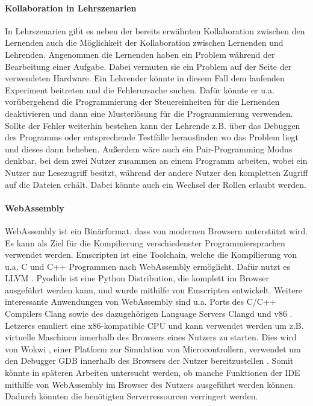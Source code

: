\paragraph{Kollaboration in Lehrszenarien}
In Lehrszenarien gibt es neben der bereits erwähnten Kollaboration zwischen den Lernenden auch die Möglichkeit der Kollaboration zwischen Lernenden und Lehrenden. Angenommen die Lernenden haben ein Problem während der Bearbeitung einer Aufgabe. Dabei vermuten sie ein Problem auf der Seite der verwendeten Hardware. Ein Lehrender könnte in diesem Fall dem laufenden Experiment beitreten und die Fehlerursache suchen. Dafür könnte er u.a. vorübergehend die Programmierung der Steuereinheiten für die Lernenden deaktivieren und dann eine Musterlösung für die Programmierung verwenden. Sollte der Fehler weiterhin bestehen kann der Lehrende z.B. über das Debuggen des Programms oder entsprechende Testfälle herausfinden wo das Problem liegt und dieses dann beheben. Außerdem wäre auch ein Pair-Programming Modus denkbar, bei dem zwei Nutzer zusammen an einem Programm arbeiten, wobei ein Nutzer nur Lesezugriff besitzt, während der andere Nutzer den kompletten Zugriff auf die Dateien erhält. Dabei könnte auch ein Wechsel der Rollen erlaubt werden.

\paragraph{WebAssembly}
WebAssembly \cite{noauthor_webassembly_nodate} ist ein Binärformat, dass von modernen Browsern unterstützt wird. Es kann als Ziel für die Kompilierung verschiedenster Programmiersprachen verwendet werden. Emscripten \cite{noauthor_emscripten_nodate} ist eine Toolchain, welche die Kompilierung von u.a. C und C++ Programmen nach WebAssembly ermöglicht. Dafür nutzt es LLVM \cite{noauthor_llvm_nodate}. Pyodide \cite{noauthor_pyodide_nodate} ist eine Python Distribution, die komplett im Browser ausgeführt werden kann, und wurde mithilfe von Emscripten entwickelt. Weitere interessante Anwendungen von WebAssembly sind u.a. Ports des C/C++ Compilers Clang \cite{noauthor_clang_nodate}\cite{smith_binjiwasm-clang_2024} sowie des dazugehörigen Language Servers Clangd \cite{noauthor_clangd_nodate}\cite{yu_guyutongxueclangd--browser_2024} und v86 \cite{fabian_copyv86_2025}. Letzeres emuliert eine x86-kompatible CPU und kann verwendet werden um z.B. virtuelle Maschinen innerhalb des Browsers eines Nutzers zu starten. Dies wird von Wokwi \cite{noauthor_wokwi_nodate}, einer Platform zur Simulation von Microcontrollern, verwendet um den Debugger GDB innerhalb des Browsers der Nutzer bereitzustellen \cite{noauthor_running_2021}. Somit könnte in späteren Arbeiten untersucht werden, ob manche Funktionen der IDE mithilfe von WebAssembly im Browser des Nutzers ausgeführt werden können. Dadurch könnten die benötigten Serverressourcen verringert werden.